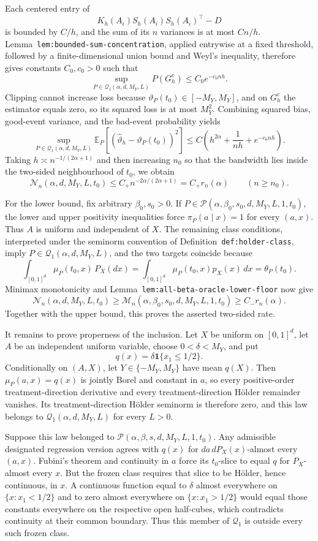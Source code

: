 Each centered entry of
\[
K_h(A_i)S_h(A_i)S_h(A_i)^\top-D
\]
is bounded by \(C/h\), and the sum of its \(n\) variances is at most \(Cn/h\). Lemma~\texttt{lem:bounded-sum-concentration}, applied entrywise at a fixed threshold, followed by a finite-dimensional union bound and Weyl's inequality, therefore gives constants \(C_0,c_0>0\) such that
\[
\sup_{P\in\mathcal Q_1(\alpha,d,M_Y,L)}P(G_h^c)
\le C_0e^{-c_0nh}.
\]
Clipping cannot increase loss because \(\vartheta_P(t_0)\in[-M_Y,M_Y]\), and on \(G_h^c\) the estimator equals zero, so its squared loss is at most \(M_Y^2\). Combining squared bias, good-event variance, and the bad-event probability yields
\[
\sup_{P\in\mathcal Q_1(\alpha,d,M_Y,L)}
\mathbb E_P[(\widehat\vartheta_h-\vartheta_P(t_0))^2]
\le C\left(h^{2\alpha}+\frac1{nh}+e^{-c_0nh}\right).
\]
Taking \(h\asymp n^{-1/(2\alpha+1)}\) and then increasing \(n_0\) so that the bandwidth lies inside the two-sided neighbourhood of \(t_0\), we obtain
\[
\mathcal N_n(\alpha,d,M_Y,L,t_0)
\le C_+n^{-2\alpha/(2\alpha+1)}
=C_+r_n(\alpha)
\qquad(n\ge n_0).
\]

For the lower bound, fix arbitrary \(\beta_0,s_0>0\). If \(P\in\mathcal P(\alpha,\beta_0,s_0,d,M_Y,L,1,t_0)\), the lower and upper positivity inequalities force \(\pi_P(a\mid x)=1\) for every \((a,x)\). Thus \(A\) is uniform and independent of \(X\). The remaining class conditions, interpreted under the seminorm convention of Definition~\texttt{def:holder-class}, imply \(P\in\mathcal Q_1(\alpha,d,M_Y,L)\), and the two targets coincide because
\[
\int_{[0,1]^d}\mu_P(t_0,x)\,P_X(dx)
=
\int_{[0,1]^d}\mu_P(t_0,x)p_X(x)\,dx
=
\theta_P(t_0).
\]
Minimax monotonicity and Lemma~\texttt{lem:all-beta-oracle-lower-floor} now give
\[
\mathcal N_n(\alpha,d,M_Y,L,t_0)
\ge
\mathcal M_n(\alpha,\beta_0,s_0,d,M_Y,L,1,t_0)
\ge C_-r_n(\alpha).
\]
Together with the upper bound, this proves the asserted two-sided rate.

It remains to prove properness of the inclusion. Let \(X\) be uniform on \([0,1]^d\), let \(A\) be an independent uniform variable, choose \(0<\delta<M_Y\), and put
\[
q(x)=\delta\mathbf 1\{x_1\le1/2\}.
\]
Conditionally on \((A,X)\), let \(Y\in\{-M_Y,M_Y\}\) have mean \(q(X)\). Then \(\mu_P(a,x)=q(x)\) is jointly Borel and constant in \(a\), so every positive-order treatment-direction derivative and every treatment-direction H\"older remainder vanishes. Its treatment-direction H\"older seminorm is therefore zero, and this law belongs to \(\mathcal Q_1(\alpha,d,M_Y,L)\) for every \(L>0\).

Suppose this law belonged to \(\mathcal P(\alpha,\beta,s,d,M_Y,L,1,t_0)\). Any admissible designated regression version agrees with \(q(x)\) for \(da\,dP_X(x)\)-almost every \((a,x)\). Fubini's theorem and continuity in \(a\) force its \(t_0\)-slice to equal \(q\) for \(P_X\)-almost every \(x\). But the frozen class requires that slice to be H\"older, hence continuous, in \(x\). A continuous function equal to \(\delta\) almost everywhere on \(\{x:x_1<1/2\}\) and to zero almost everywhere on \(\{x:x_1>1/2\}\) would equal those constants everywhere on the respective open half-cubes, which contradicts continuity at their common boundary. Thus this member of \(\mathcal Q_1\) is outside every such frozen class.

